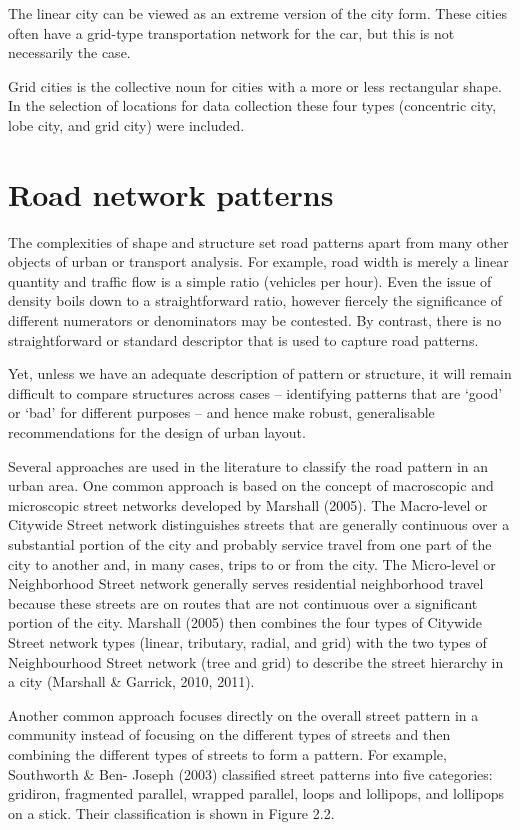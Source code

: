 The linear city can be viewed as an extreme version of the city form. These cities often have a grid-type transportation network for the car, but this is not necessarily the case. 

Grid cities is the collective noun for cities with a more or less rectangular shape. In the selection of locations for data collection these four types (concentric city, lobe city, and grid city) were included.


\section{Road network patterns}
The complexities of shape and structure set road patterns apart from many other objects of urban or transport analysis. For example, road width is merely a linear quantity and traffic flow is a simple ratio (vehicles per hour). Even the issue of density boils down to a straightforward ratio, however fiercely the significance of different numerators or denominators may be contested. By contrast, there is no straightforward or standard descriptor that is used to capture road patterns. 

Yet, unless we have an adequate description of pattern or structure, it will remain difficult to compare structures across cases – identifying patterns that are ‘good’ or ‘bad’ for different purposes – and hence make robust, generalisable recommendations for the design of urban layout.

Several approaches are used in the literature to classify the road pattern in an urban area. One common approach is based on the concept of macroscopic and microscopic street networks developed by Marshall (2005). The Macro-level or Citywide Street network distinguishes streets that are generally continuous over a substantial portion of the city and probably service travel from one part of the city to another and, in many cases, trips to or from the city. The Micro-level or Neighborhood Street network generally serves residential neighborhood travel because these streets are on routes that are not continuous over a significant portion of the city. Marshall (2005) then combines the four types of Citywide Street network types (linear, tributary, radial, and grid) with the two types of Neighbourhood Street network (tree and grid) to describe the street hierarchy in a city (Marshall & Garrick, 2010, 2011). 

Another common approach focuses directly on the overall street pattern in a community instead of focusing on the different types of streets and then combining the different types of streets to form a pattern. For example, Southworth \& Ben- Joseph (2003) classified street patterns into five categories: gridiron, fragmented parallel, wrapped parallel, loops and lollipops, and lollipops on a stick. Their classification is shown in Figure 2.2.

